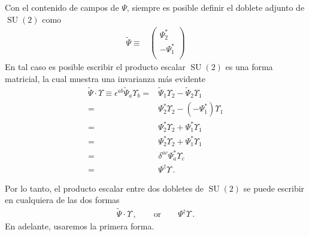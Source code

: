 \begin{frame}
 Con el contenido de campos de $\Psi$, siempre es posible definir el doblete adjunto de $\operatorname{SU}(2)$ como 
\begin{align}
\label{eq:conjA}
 \widetilde{\Psi}\equiv & \begin{pmatrix}
                  \Psi_2^{*}\\
                 -\Psi_1^{*}\\
                \end{pmatrix}
\end{align}
En tal caso es posible escribir el producto escalar $\operatorname{SU}(2)$ es una forma matricial, la cual muestra una invarianza más evidente
\begin{align}
\widetilde{\Psi}\cdot \Upsilon\equiv \epsilon^{ab}\widetilde{\Psi}_a \Upsilon_b=&\widetilde{\Psi}_1 \Upsilon_2-\widetilde{\Psi}_2 \Upsilon_1 \nonumber\\
                     =&\Psi_2^{*}\Upsilon_2 -(-\Psi_1^{*}) \Upsilon_1 \nonumber\\
                     =&\Psi_2^{*}\Upsilon_2 +\Psi_1^{*} \Upsilon_1 \nonumber\\
                     =&\Psi_2^{*}\Upsilon_2 +\Psi_1^{*} \Upsilon_1 \nonumber\\
                     =&\delta^{ac}\Psi_a^{*}\Upsilon_c \nonumber\\
                     =&\Psi^{\dagger} \Upsilon\,.
 \end{align}

Por lo tanto, el producto escalar entre dos dobletes de $\operatorname{SU}(2)$ se puede escribir en cualquiera de las dos formas
\begin{align}
  \widetilde{\Psi}\cdot \Upsilon\,, \qquad\text{or}   \qquad \Psi^{\dagger}\Upsilon\,.
\end{align}
En adelante, usaremos la primera forma.


\end{frame}
